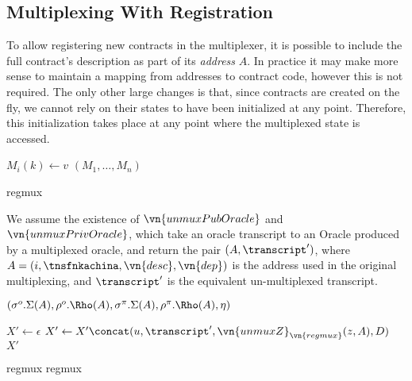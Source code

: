 \subsection{Multiplexing With Registration}
\label{sec:regmux}

To allow registering new contracts in the multiplexer, it is possible to include
the full contract's description as part of its \emph{address} $A$. In practice
it may make more sense to maintain a mapping from addresses to contract code,
however this is not required. The only other large changes is
that, since contracts are created on the fly, we cannot rely on their states to
have been initialized at any point. Therefore, this initialization takes place
at any point where the multiplexed state is accessed.

\begin{algorithmic}
        \Let $M_i(k) \gets v$
      \EndIf
    \EndFor
    \State \Return $(M_1, \ldots, M_n)$
  \EndFunction
\end{algorithmic}

{regmux}

\sloppy
We assume the existence of $\vn{unmuxPubOracle}$ and $\vn{unmuxPrivOracle}$,
which take an oracle transcript to an Oracle produced by a multiplexed oracle,
and return the pair $(A, \transcript')$, where $A = (i, \tnsfnkachina, \vn{desc},
\vn{dep})$ is the address used in the original multiplexing, and $\transcript'$
is the equivalent un-multiplexed transcript.

\fussy
\begin{algorithmic}
    \State \Return $(\sigma^o.\Sigma(A), \rho^o.\Rho(A), \sigma^\pi.\Sigma(A),
      \rho^\pi.\Rho(A), \eta)$
  \EndFunction
\end{algorithmic}
\begin{algorithmic}
    \State \Let $X' \gets \epsilon$
        \State \Let $X' \gets X' \concat (u, \transcript',
          \vn{unmuxZ}_{\vn{regmux}}(z, A), D)$
      \EndIf
    \EndFor
    \State \Return $X'$
  \EndFunction
\end{algorithmic}
{regmux}
{regmux}

